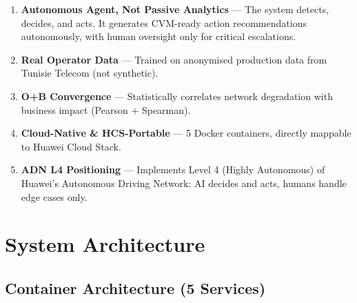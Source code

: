 \documentclass[12pt,a4paper]{report}
\begin{document}
\begin{enumerate}[nosep]
  \item \textbf{Autonomous Agent, Not Passive Analytics} --- The system detects, decides, and acts. It generates CVM-ready action recommendations autonomously, with human oversight only for critical escalations.
  \item \textbf{Real Operator Data} --- Trained on anonymised production data from Tunisie Telecom (not synthetic).
  \item \textbf{O+B Convergence} --- Statistically correlates network degradation with business impact (Pearson + Spearman).
  \item \textbf{Cloud-Native \& HCS-Portable} --- 5 Docker containers, directly mappable to Huawei Cloud Stack.
  \item \textbf{ADN L4 Positioning} --- Implements Level 4 (Highly Autonomous) of Huawei's Autonomous Driving Network: AI decides and acts, humans handle edge cases only.
\end{enumerate}

\chapter{System Architecture}

\section{Container Architecture (5 Services)}
\end{document}
